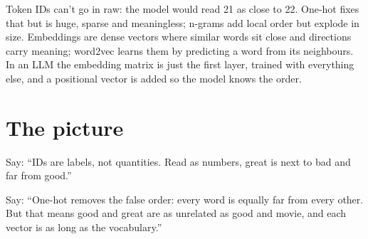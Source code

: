 \begin{sayit}
Token IDs can't go in raw: the model would read 21 as close to 22. One-hot fixes that but is huge, sparse and meaningless; n-grams add local order but explode in size. Embeddings are dense vectors where similar words sit close and directions carry meaning; word2vec learns them by predicting a word from its neighbours. In an LLM the embedding matrix is just the first layer, trained with everything else, and a positional vector is added so the model knows the order.
\end{sayit}

\section{The picture}

\begin{sayit}
\begin{pic}
\end{pic}
Say: ``IDs are labels, not quantities. Read as numbers, great is next to bad and far from good.''
\end{sayit}

\begin{sayit}
\begin{pic}
\end{pic}
Say: ``One-hot removes the false order: every word is equally far from every other. But that means good and great are as unrelated as good and movie, and each vector is as long as the vocabulary.''
\end{sayit}

